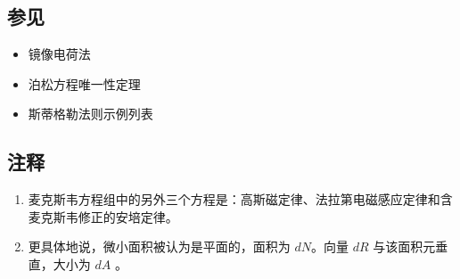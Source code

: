 \subsection{参见}
\begin{itemize}
\item 镜像电荷法
\item 泊松方程唯一性定理
\item 斯蒂格勒法则示例列表
\end{itemize}
\subsection{注释}
\begin{enumerate}
\item 麦克斯韦方程组中的另外三个方程是：高斯磁定律、法拉第电磁感应定律和含麦克斯韦修正的安培定律。
\item 更具体地说，微小面积被认为是平面的，面积为 \( dN \)。向量 \( dR \) 与该面积元垂直，大小为 \( dA \) 。
\end{enumerate}
